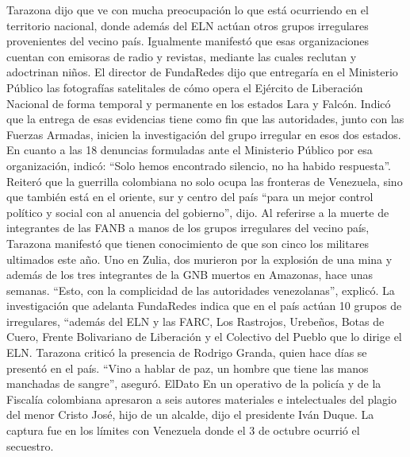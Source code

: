 \documentclass{article}%
\begin{document}
\newline%
%
Tarazona dijo que ve con mucha preocupación lo que está ocurriendo en el territorio nacional, donde además del ELN actúan otros grupos irregulares provenientes del vecino país. Igualmente manifestó que esas organizaciones cuentan con emisoras de radio y revistas, mediante las cuales reclutan y adoctrinan niños.%
\newline%
%
El director de FundaRedes dijo que entregaría en el Ministerio Público las fotografías satelitales de cómo opera el Ejército de Liberación Nacional de forma temporal y permanente en los estados Lara y Falcón.%
\newline%
%
Indicó que la entrega de esas evidencias tiene como fin que las autoridades, junto con las Fuerzas Armadas, inicien la investigación del grupo irregular en esos dos estados.%
\newline%
%
En cuanto a las 18 denuncias formuladas ante el Ministerio Público por esa organización, indicó: “Solo hemos encontrado silencio, no ha habido respuesta”. Reiteró que la guerrilla colombiana no solo ocupa las fronteras de Venezuela, sino que también está en el oriente, sur y centro del país “para un mejor control político y social con al anuencia del gobierno”, dijo.%
\newline%
%
Al referirse a la muerte de integrantes de las FANB a manos de los grupos irregulares del vecino país, Tarazona manifestó que tienen conocimiento de que son cinco los militares ultimados este año. Uno en Zulia, dos murieron por la explosión de una mina y además de los tres integrantes de la GNB muertos en Amazonas, hace unas semanas. “Esto, con la complicidad de las autoridades venezolanas”, explicó.%
\newline%
%
La investigación que adelanta FundaRedes indica que en el país actúan 10 grupos de irregulares, “además del ELN y las FARC, Los Rastrojos, Urebeños, Botas de Cuero, Frente Bolivariano de Liberación y el Colectivo del Pueblo que lo dirige el ELN.%
\newline%
%
Tarazona criticó la presencia de Rodrigo Granda, quien hace días se presentó en el país. “Vino a hablar de paz, un hombre que tiene las manos manchadas de sangre”, aseguró.%
\newline%
%
ElDato%
\newline%
%
En un operativo de la policía y de la Fiscalía colombiana apresaron a seis autores materiales e intelectuales del plagio del menor Cristo José, hijo de un alcalde, dijo el presidente Iván Duque. La captura fue en los límites con Venezuela donde el 3 de octubre ocurrió el secuestro.%
\newline%
%
\end{document}
